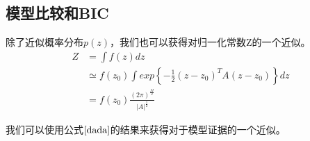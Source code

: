 \subsection*{模型比较和BIC}
除了近似概率分布$p(z)$，我们也可以获得对归一化常数Z的一个近似。
\begin{equation}
\label{dada}
	\begin{aligned}
	   Z&=\int f(z)dz\\
		&\simeq f(z_0)\int exp\left\{-\frac{1}{2}(z-z_0)^TA(z-z_0) \right\}dz\\
		&=f(z_0)\frac{(2\pi)^{\frac{M}{2}}}{|A|^{\frac{1}{2}}}
	\end{aligned}
\end{equation}

我们可以使用公式$\ref{dada}$的结果来获得对于模型证据的一个近似。